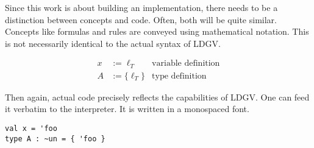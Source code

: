 Since this work is about building an implementation, there needs to be a distinction between concepts and code. Often, both will be quite similar. Concepts like formulas and rules are conveyed using mathematical notation. This is not necessarily identical to the actual syntax of LDGV.

\begin{align*}
 x &:= \ell_T & \text{variable definition} \\
 A &:= \{ \ell_T \} & \text{type definition}
\end{align*}

Then again, actual code precisely reflects the capabilities of LDGV. One can feed it verbatim to the interpreter. It is written in a monospaced font.

\begin{lstlisting}[language=ldgv,caption=Code listing example]
val x = 'foo
type A : ~un = { 'foo }
\end{lstlisting}
